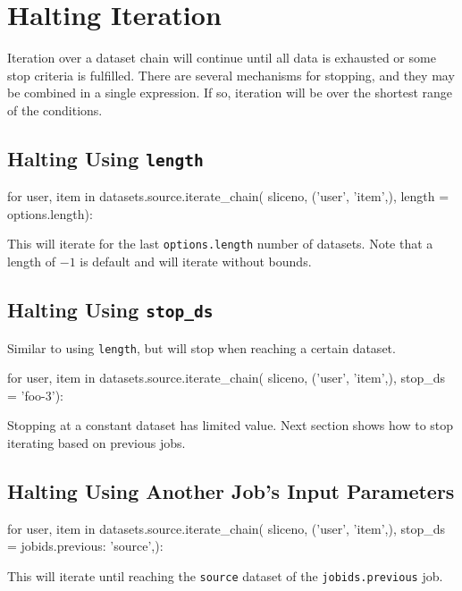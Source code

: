 \section{Halting Iteration}

Iteration over a dataset chain will continue until all data is
exhausted or some stop criteria is fulfilled.  There are several
mechanisms for stopping, and they may be combined in a single
expression.  If so, iteration will be over the shortest range of the
conditions.

\subsection*{Halting Using \texttt{length}}
\begin{python}
for user, item in datasets.source.iterate_chain(
    sliceno, ('user', 'item',),
    length = options.length):
\end{python}
This will iterate for the last \texttt{options.length} number of
datasets.  Note that a length of $-1$ is default and will iterate
without bounds.


\subsection*{Halting Using \texttt{stop\_ds}}
Similar to using \texttt{length}, but will stop when reaching a
certain dataset.
\begin{python}
for user, item in datasets.source.iterate_chain(
    sliceno, ('user', 'item',),
    stop_ds = 'foo-3'):
\end{python}
Stopping at a constant dataset has limited value.  Next section shows
how to stop iterating based on previous jobs.



\subsection*{Halting Using Another Job's Input Parameters}
\begin{python}
for user, item in datasets.source.iterate_chain(
    sliceno, ('user', 'item',),
    stop_ds = {jobids.previous: 'source',}):
\end{python}
This will iterate until reaching the \texttt{source} dataset of
the \texttt{jobids.previous} job.



